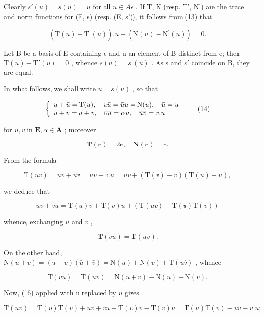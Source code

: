 Clearly \(s'(u) = s(u) = u\) for all \(u \in Ae\) . If T, N (resp. T', N') are the trace and norm functions for (E, s) (resp. (E, s')), it follows from (13) that

\[
(\mathrm{T} (u) - \mathrm{T} ^ {\prime} (u)). u - (\mathrm{N} (u) - \mathrm{N} ^ {\prime} (u)) = 0.
\]

Let B be a basis of E containing e and u an element of B distinct from e; then \(\mathrm{T}(u) - \mathrm{T}'(u) = 0\) , whence \(s(u) = s'(u)\) . As s and \(s'\) coincide on B, they are equal.

In what follows, we shall write \(\bar{u} = s(u)\) , so that

\[
\left\{ \begin{array}{l l} u + \bar {u} = \mathrm{T} (u), & u \bar {u} = \bar {u} u = \mathrm{N} (u), \quad \bar {\bar {u}} = u \\ \overline {{u + v}} = \bar {u} + \bar {v}, & \overline {{\alpha u}} = \alpha \bar {u}, \quad \overline {{u v}} = \bar {v}. \bar {u} \end{array} \right.\tag{14}
\]

for \(u, v\) in \(\mathbf{E}, \alpha \in \mathbf{A}\) ; moreover

\[
\mathbf {T} (e) = 2 e, \quad \mathbf {N} (e) = e.\tag{15}
\]

From the formula

\[
\mathrm{T} (u v) = u v + \overline {{{{u v}}}} = u v + \bar {v}. \bar {u} = u v + (\mathrm{T} (v) - v) (\mathrm{T} (u) - u),
\]

we deduce that

\[
u v + v u = \mathrm{T} (u) v + \mathrm{T} (v) u + (\mathrm{T} (u v) - \mathrm{T} (u) \mathrm{T} (v))\tag{16}
\]

whence, exchanging \(u\) and \(v\) ,

\[
\mathbf {T} (v u) = \mathbf {T} (u v).\tag{17}
\]

On the other hand, \(\mathrm{N}(u+v)=(u+v)(\bar{u}+\bar{v})=\mathrm{N}(u)+\mathrm{N}(v)+\mathrm{T}(u\bar{v})\) , whence

\[
\mathrm{T} (v \bar {u}) = \mathrm{T} (u \bar {v}) = \mathrm{N} (u + v) - \mathrm{N} (u) - \mathrm{N} (v).\tag{18}
\]

Now, (16) applied with u replaced by \(\bar{u}\) gives

\[
\mathrm{T} (u \bar {v}) = \mathrm{T} (u) \mathrm{T} (v) + \bar {u} v + v \bar {u} - \mathrm{T} (u) v - \mathrm{T} (v) \bar {u} = \mathrm{T} (u) \mathrm{T} (v) - u v - \bar {v}. \bar {u};
\]

